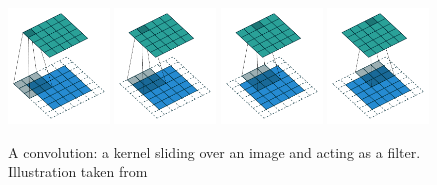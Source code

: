 \begin{figure}[ht]
    \centering
    \includegraphics[width=0.24\textwidth]{figures/main/ch2-background/conv_00.pdf}
    \includegraphics[width=0.24\textwidth]{figures/main/ch2-background/conv_01.pdf}
    \includegraphics[width=0.24\textwidth]{figures/main/ch2-background/conv_02.pdf}
    \includegraphics[width=0.24\textwidth]{figures/main/ch2-background/conv_03.pdf}
    \caption{A convolution: a kernel sliding over an image and acting as a filter. \\Illustration taken from~\citet{dumoulin2016guide}}
    \label{figure:illustration_convolution}
\end{figure}




